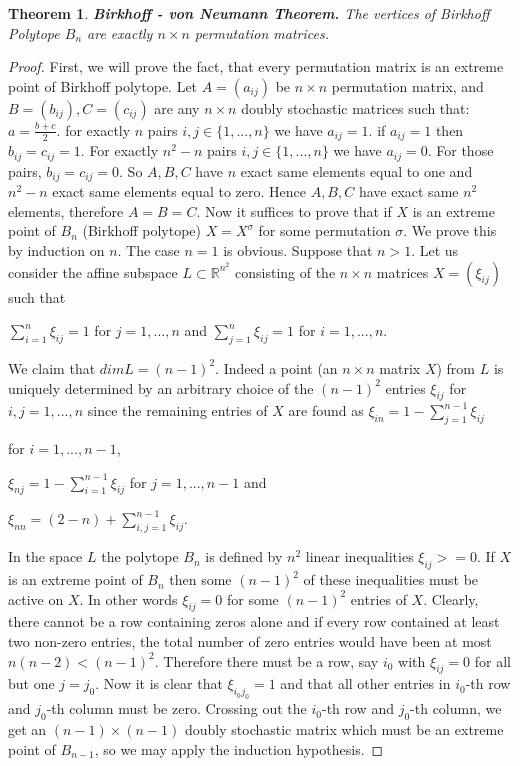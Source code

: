 \documentclass[11pt]{article}
\theoremstyle{plain}
\newtheorem{theorem}[thm]{Theorem}
\theoremstyle{definition}
\begin{document}
\begin{theorem}
    \textbf{Birkhoff - von Neumann Theorem.} The vertices of Birkhoff Polytope $B_{n}$ are exactly $n\times n$ permutation matrices.
\end{theorem}
\begin{proof}
    First, we will prove the fact, that every permutation matrix is an extreme point of Birkhoff polytope.
    Let $A=(a_{ij})$  be $n\times n$ permutation matrix, and $B = (b_{ij}),C=(c_{ij})$ are any $n\times n$ doubly stochastic matrices such that:
    $a = \frac{b+c}{2}$.
    for exactly $n$ pairs $i,j \in \{1,...,n\}$ we have $a_{ij}=1$. if $a_{ij} = 1$ then $b_{ij} = c_{ij} = 1$. For exactly $n^2-n$ pairs $i,j \in \{1,...,n\}$ we have  $a_{ij}=0$. For those pairs, $b_{ij} = c_{ij} = 0$.
    So $A,B,C$ have $n$ exact same elements equal to one and $n^2-n$ exact same elements equal to zero. Hence $A,B,C$ have exact same $n^2$ elements, therefore $A=B=C$.
    Now it suffices to prove that if $X$ is an extreme point of $B_n$ (Birkhoff polytope) $X = X^\sigma$ for some permutation $\sigma$. We prove this by induction on $n$. The case $n=1$ is obvious. Suppose that $n>1$. Let us consider the affine subspace $L \subset \mathbb{R}^{n^2}$ consisting of the $n \times n$ matrices $X = (\xi_{ij})$ such that

    $\sum_{i=1}^n \xi_{ij} = 1$ for $j=1,...,n$ and $\sum_{j=1}^n \xi_{ij} = 1$ for $i=1,...,n$.

    We claim that $dimL = (n-1)^2$. Indeed a point (an $n \times n $ matrix $X$) from $L$ is uniquely determined by an arbitrary choice of the $(n-1)^2$ entries $\xi_{ij}$ for $i,j=1,...,n$ since the remaining entries of $X$ are found as
        $\xi_{in} = 1 - \sum_{j=1}^{n-1}\xi_{ij}$

        for $i=1,...,n-1$,

    
    $\xi_{nj} = 1 - \sum_{i=1}^{n-1} \xi_{ij}$ for $j=1,...,n-1$ and

    
    $\xi_{nn}= (2-n) + \sum_{i,j=1}^{n-1} \xi_{ij}$. 

    
    In the space $L$ the polytope $B_n$ is defined by $n^2$ linear inequalities $\xi_{ij} >=0$. If $X$ is an extreme point of $B_{n}$ then some $(n-1)^2$ of these inequalities must be active on $X$. In other words $\xi_{ij} = 0$ for some $(n-1)^2$ entries of $X$. Clearly, there cannot be a row containing zeros alone and if every row contained at least two non-zero entries, the total number of zero entries would have been at most $n(n-2) < (n-1)^2$. Therefore there must be a row, say $i_{0}$ with $ \xi_{ij} =0$ for all but one $j=j_0$. Now it is clear that $\xi_{i_0 j_0} = 1$ and that all other entries in $i_0$-th row and $j_0$-th column must be zero. Crossing out the $i_0$-th row and $j_0$-th column, we get an $(n-1) \times (n-1)$ doubly stochastic matrix which must be an extreme point of $B_{n-1}$, so we may apply the induction hypothesis.
\end{proof}
\end{document}
